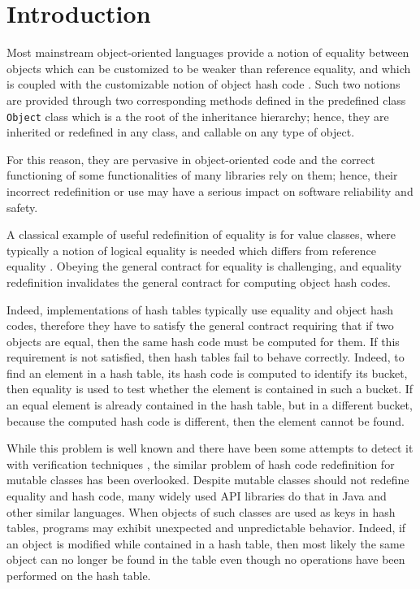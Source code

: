\section{Introduction}

Most mainstream object-oriented languages provide a notion of equality between objects which can be customized to be weaker than
reference equality, and which is coupled with the customizable notion of object hash code \cite{Bloch18}. Such two notions are provided
through two corresponding methods defined in the predefined class \lstinline{Object} class which is a the root of the inheritance hierarchy; hence,
they are inherited or redefined in any class, and callable on any type of object.

For this reason, they are pervasive in object-oriented code and the correct functioning of some functionalities of many libraries rely on them;
hence, their incorrect redefinition or use may have a serious impact on software reliability and safety.

A classical example of useful redefinition of equality is for value classes, where typically a notion of logical equality is needed which differs
from reference equality \cite{Bloch18}. 
Obeying the general contract for equality is challenging, and equality redefinition invalidates the general contract for computing
object hash codes.

Indeed, implementations of hash tables typically use equality and object hash codes, therefore
they have to satisfy the general contract requiring that if two objects are equal,
then the same hash code must be computed for them. If this requirement is not satisfied, then hash tables fail to behave correctly.
Indeed, to find an element in a hash table, its hash code is computed to identify its bucket, then
equality is used to test whether the element is contained in such a bucket. If an equal element is already contained in the hash table, but in
a different bucket, because the computed hash code is different, then the element cannot be found.

While this problem is well known and there have been some attempts to detect it with verification techniques \cite{Bloch18,OkanoHSON19},
the similar problem of hash code redefinition for mutable classes has been overlooked.
Despite mutable classes should not redefine equality and hash code, many widely used API libraries do that in Java and other similar languages.
When objects of such classes are used as keys in hash tables, programs may exhibit unexpected and unpredictable behavior. Indeed,
if an object is modified while contained in a hash table, then most likely the same object can no longer be found in the table
even though no operations have been performed on the hash table.

